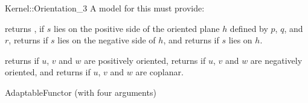 \begin{ccRefFunctionObjectConcept}{Kernel::Orientation_3}
A model for this must provide:


{returns , if $s$ lies on the positive side of the oriented 
plane $h$ defined by $p$, $q$, and $r$, returns  if $s$ 
lies on the negative side of $h$, and returns  if $s$ lies
on $h$.}

{returns  if $u$, $v$ and $w$ are positively oriented,
returns  if $u$, $v$ and $w$ are negatively oriented,
and returns  if $u$, $v$ and $w$ are coplanar.}

\ccRefines
AdaptableFunctor (with four arguments)

\ccSeeAlso
{} \\

\end{ccRefFunctionObjectConcept}
